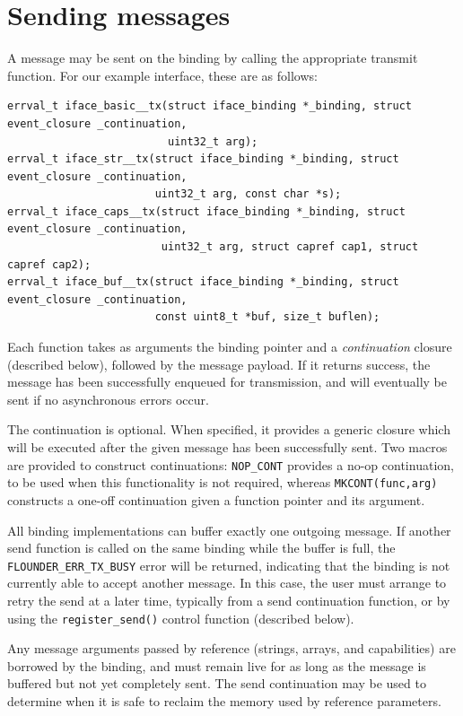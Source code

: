 \documentclass[a4paper,twoside]{report} %
\begin{document}
\section{Sending messages}

A message may be sent on the binding by calling the appropriate transmit
function. For our example interface, these are as follows:

\begin{lstlisting}
errval_t iface_basic__tx(struct iface_binding *_binding, struct event_closure _continuation,
                         uint32_t arg);
errval_t iface_str__tx(struct iface_binding *_binding, struct event_closure _continuation,
                       uint32_t arg, const char *s);
errval_t iface_caps__tx(struct iface_binding *_binding, struct event_closure _continuation,
                        uint32_t arg, struct capref cap1, struct capref cap2);
errval_t iface_buf__tx(struct iface_binding *_binding, struct event_closure _continuation,
                       const uint8_t *buf, size_t buflen);
\end{lstlisting}

Each function takes as arguments the binding pointer and a
\emph{continuation} closure (described below), followed by the message payload.
If it returns success, the message has been successfully enqueued for
transmission, and will eventually be sent if no asynchronous errors occur.

The continuation is optional. When specified, it provides a generic closure
which will be executed after the given message has been successfully sent.
Two macros are provided to construct continuations: \lstinline+NOP_CONT+
provides a no-op continuation, to be used when this functionality is not
required, whereas \lstinline+MKCONT(func,arg)+ constructs a one-off continuation
given a function pointer and its argument.

All binding implementations can buffer exactly one outgoing message. If another
send function is called on the same binding while the buffer is full, the
\lstinline+FLOUNDER_ERR_TX_BUSY+ error will be returned, indicating that the
binding is not currently able to accept another message. In this case, the user
must arrange to retry the send at a later time, typically from a send
continuation function, or by using the \lstinline+register_send()+ control
function (described below).

Any message arguments passed by reference (strings, arrays, and capabilities)
are borrowed by the binding, and must remain live for as long as the message
is buffered but not yet completely sent. The send continuation may be used to
determine when it is safe to reclaim the memory used by reference parameters.
\end{document}
